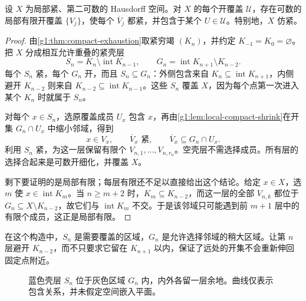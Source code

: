 \begin{theorem}\label{g1:thm:lch-paracompact}
	设 \(X\) 为局部紧、第二可数的 Hausdorff 空间。对 \(X\) 的每个开覆盖 \(\mathcal U\)，存在可数的局部有限开覆盖 \(\{V_j\}\)，使每个 \(\overline V_j\) 都紧，并包含于某个 \(U\in\mathcal U\)。特别地，\(X\) 仿紧。
\end{theorem}
\begin{proof}
	由\cref{g1:thm:compact-exhaustion}取紧穷竭 \((K_n)\)，并约定 \(K_{-1}=K_0=\varnothing\)。把 \(X\) 分成相互允许重叠的紧壳层
	\[
		S_n=K_n\setminus\operatorname{int}K_{n-1},
		\qquad
		G_n=\operatorname{int}K_{n+1}\setminus K_{n-2}.
	\]
	每个 \(S_n\) 紧，每个 \(G_n\) 开，而且 \(S_n\subseteq G_n\)：外侧包含来自 \(K_n\subseteq\operatorname{int}K_{n+1}\)，内侧避开 \(K_{n-2}\) 则来自 \(K_{n-2}\subseteq\operatorname{int}K_{n-1}\)。这些 \(S_n\) 覆盖 \(X\)，因为每个点第一次进入某个 \(K_n\) 时就属于 \(S_n\)。

	对每个 \(x\in S_n\)，选原覆盖成员 \(U_x\) 包含 \(x\)，再由\cref{g1:lem:local-compact-shrink}在开集 \(G_n\cap U_x\) 中缩小邻域，得到
	\[
		x\in V_x,\qquad
		\overline V_x\text{ 紧},\qquad
		\overline V_x\subseteq G_n\cap U_x.
	\]
	利用 \(S_n\) 紧，为这一层保留有限个 \(V_{n,1},\ldots,V_{n,r_n}\)。空壳层不需选择成员。所有层的选择合起来是可数开细化，并覆盖 \(X\)。

	剩下要证明的是局部有限；每层有限还不足以直接给出这个结论。给定 \(x\in X\)，选 \(m\) 使 \(x\in\operatorname{int}K_m\)。当 \(n\ge m+2\) 时，\(K_m\subseteq K_{n-2}\)，而这一层的全部 \(V_{n,k}\) 都位于 \(G_n\subseteq X\setminus K_{n-2}\)，故它们与 \(\operatorname{int}K_m\) 不交。于是该邻域只可能遇到前 \(m+1\) 层中的有限个成员，这正是局部有限。
\end{proof}

在这个构造中，\(S_n\) 是需要覆盖的区域，\(G_n\) 是允许选择邻域的稍大区域。让第 \(n\) 层避开 \(K_{n-2}\)，而不只要求它留在 \(K_{n+1}\) 以内，保证了远处的开集不会重新伸回固定点附近。

\begin{figure}[htbp]
	\centering
	
	\caption{蓝色壳层 \(S_n\) 位于灰色区域 \(G_n\) 内，内外各留一层余地。曲线仅表示包含关系，并未假定空间嵌入平面。}
	\label{g1:fig:compact-exhaustion-shells}
\end{figure}

